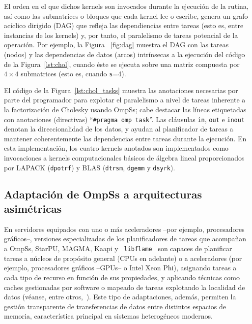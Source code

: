 El orden en el que dichos kernels son invocados durante la ejecución de la rutina, 
así como las submatrices o bloques que cada kernel lee o escribe, genera un grafo acíclico dirigido (DAG)
que refleja las dependiencias entre tareas (esto es, entre instancias de los kernels) y, por tanto,
el paralelismo de tareas potencial de la operación.
Por ejemplo, la Figura ~\ref{fig:dag} muestra el DAG con las tareas (nodos) y las dependencias de datos
(arcos) intrínsecas a la ejecución del código de la Figura~\ref{lst:chol}, cuando éste se ejecuta sobre
una matriz compuesta por $4 \times 4$ submatrices (esto es, cuando {\tt s}=4).  

El código de la Figura~\ref{lst:chol_tasks} muestra las anotaciones necesarias por parte del programador para explotar
el paralelismo a nivel de tareas inherente a la factorización de Cholesky usando OmpSs; cabe destacar las líneas etiquetadas
con  anotaciones (directivas) ``{\tt \#pragma omp task}''.
Las cláusulas {\tt in}, {\tt out} e {\tt inout} denotan la direccionalidad de los datos, y ayudan al planificador
de tareas a mantener coherentemente las dependencias entre tareas durante la ejecución. 
En esta implementación, los cuatro kernels anotados son implementados como invocaciones a 
kernels computacionales básicos de álgebra lineal proporcionados por LAPACK
({\tt dpotrf}) y BLAS ({\tt dtrsm}, {\tt dgemm} y {\tt dsyrk}).



\subsection{Adaptación de OmpSs a arquitecturas asimétricas}
\label{s3:botlev}

En servidores equipados con uno o más aceleradores --por ejemplo,
procesadores gráficos--, versiones especializadas de los planificadores de
tareas que acompañan a OmpSs, StarPU, MAGMA, Kaapi y {\tt
  libflame}~\cite{libflameref} son capaces de planificar tareas a núcleos
de propósito general (CPUs en adelante) o a aceleradores (por ejemplo,
procesadores gráficos --GPUs-- o Intel Xeon Phi), asignando tareas a cada
tipo de recurso en función de sus propiedades, y aplicando técnicas como
caches gestionadas por software o mapeado de tareas explotando la localidad
de datos (véanse, entre
otros,~\cite{Quintana:2008:PMA,CPE:CPE1463,Augonnet:2011:SUP:1951453.1951454,5470941,Gautier:2013:XRS:2510661.2511383}). Este
tipo de adaptaciones, además, permiten la gestión transparente de
transferencias de datos entre distintos espacios de memoria, característica
principal en sistemas heterogéneos modernos.






